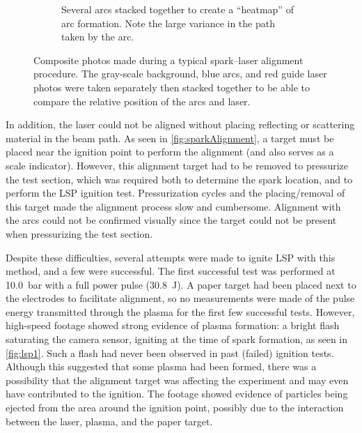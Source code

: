 \begin{figure}[h]
\begin{subfigure}[t]{0.47\textwidth}
                    \caption{Several arcs stacked together to create a ``heatmap'' of arc formation. Note the large variance in the path taken by the arc.}
                    \label{fig:sparkAlignment_heatmap}
                \end{subfigure}
                \caption[Composite photos made during a typical spark--laser alignment procedure]{Composite photos made during a typical spark--laser alignment procedure. The gray-scale background, blue arcs, and red guide laser photos were taken separately then stacked together to be able to compare the relative position of the arcs and laser.}
                \label{fig:sparkAlignment}
            \end{figure}

            In addition, the laser could not be aligned without placing reflecting or scattering material in the beam path. As seen in \autoref{fig:sparkAlignment}, a target must be placed near the ignition point to perform the alignment (and also serves as a scale indicator). However, this alignment target had to be removed to pressurize the test section, which was required both to determine the spark location, and to perform the LSP ignition test. Pressurization cycles and the placing/removal of this target made the alignment process slow and cumbersome. Alignment with the arcs could not be confirmed visually since the target could not be present when pressurizing the test section.

            Despite these difficulties, several attempts were made to ignite LSP with this method, and a few were successful. The first successful test was performed at \qty{10.0}{bar} with a full power pulse (\qty{30.8}{J}). A paper target had been placed next to the electrodes to facilitate alignment, so no measurements were made of the pulse energy transmitted through the plasma for the first few successful tests. However, high-speed footage showed strong evidence of plasma formation: a bright flash saturating the camera sensor, igniting at the time of spark formation, as seen in \autoref{fig:lsp1}. Such a flash had never been observed in past (failed) ignition tests. Although this suggested that some plasma had been formed, there was a possibility that the alignment target was affecting the experiment and may even have contributed to the ignition. The footage showed evidence of particles being ejected from the area around the ignition point, possibly due to the interaction between the laser, plasma, and the paper target.


